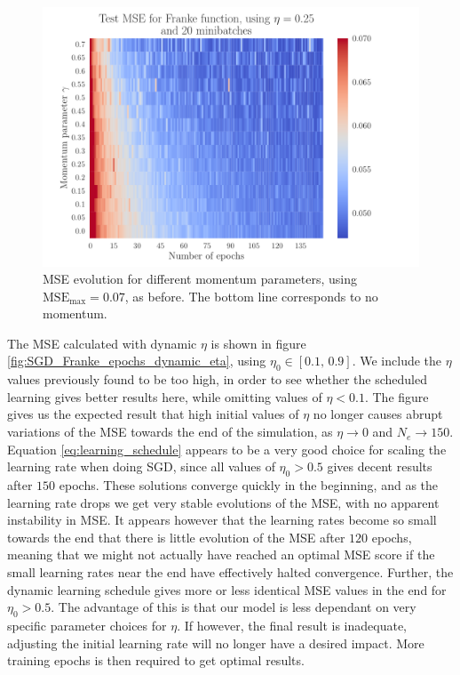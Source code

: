 \documentclass[12pt]{extarticle}
\begin{document}
\begin{figure}[h!]
	\includegraphics[width=0.9\linewidth]{SGD_Franke/reg_Franke__epochs_gamma__Test_MSE__239373.pdf}
	\caption{MSE evolution for different momentum parameters, using $\mathrm{MSE}_\mathrm{max}=0.07$, as before. The bottom line corresponds to no momentum.}
	\label{fig:SGD_Franke_epochs_gamma}
\end{figure}


The MSE calculated with dynamic $\eta$ is shown in figure \ref{fig:SGD_Franke_epochs_dynamic_eta}, using $\eta_0\in[0.1,\,0.9]$. We include the $\eta$ values previously found to be too high, in order to see whether the scheduled learning gives better results here, while omitting values of $\eta<0.1$. The figure gives us the expected result that high initial values of $\eta$ no longer causes abrupt variations of the MSE towards the end of the simulation, as $\eta\to0$ and $N_e\to150$. Equation \eqref{eq:learning_schedule} appears to be a very good choice for scaling the learning rate when doing SGD, since all values of $\eta_0>0.5$ gives decent results after $150$ epochs. These solutions converge quickly in the beginning, and as the learning rate drops we get very stable evolutions of the MSE, with no apparent instability in MSE. It appears however that the learning rates become so small towards the end that there is little evolution of the MSE after $120$ epochs, meaning that we might not actually have reached an optimal MSE score if the small learning rates near the end have effectively halted convergence. Further, the dynamic learning schedule gives more or less identical MSE values in the end for $\eta_0>0.5$. The advantage of this is that our model is less dependant on very specific parameter choices for $\eta$. If however, the final result is inadequate, adjusting the initial learning rate will no longer have a desired impact. More training epochs is then required to get optimal results.
\end{document}
